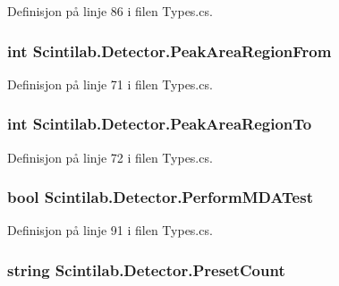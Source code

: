 Definisjon på linje 86 i filen Types.\+cs.

\hypertarget{class_scintilab_1_1_detector_a13b0edf1a6c0daa1b656ef2c0f80be3b}{
\subsubsection[{Peak\+Area\+Region\+From}]{\setlength{\rightskip}{0pt plus 5cm}int Scintilab.\+Detector.\+Peak\+Area\+Region\+From}}\label{class_scintilab_1_1_detector_a13b0edf1a6c0daa1b656ef2c0f80be3b}


Definisjon på linje 71 i filen Types.\+cs.

\hypertarget{class_scintilab_1_1_detector_a818975b79ec85722917ea173ec185d5b}{
\subsubsection[{Peak\+Area\+Region\+To}]{\setlength{\rightskip}{0pt plus 5cm}int Scintilab.\+Detector.\+Peak\+Area\+Region\+To}}\label{class_scintilab_1_1_detector_a818975b79ec85722917ea173ec185d5b}


Definisjon på linje 72 i filen Types.\+cs.

\hypertarget{class_scintilab_1_1_detector_af85caf543049c7e1be4cfc050c8982b3}{
\subsubsection[{Perform\+M\+D\+A\+Test}]{\setlength{\rightskip}{0pt plus 5cm}bool Scintilab.\+Detector.\+Perform\+M\+D\+A\+Test}}\label{class_scintilab_1_1_detector_af85caf543049c7e1be4cfc050c8982b3}


Definisjon på linje 91 i filen Types.\+cs.

\hypertarget{class_scintilab_1_1_detector_a68bb937831fda468f20adeea6e8b94ea}{
\subsubsection[{Preset\+Count}]{\setlength{\rightskip}{0pt plus 5cm}string Scintilab.\+Detector.\+Preset\+Count}}\label{class_scintilab_1_1_detector_a68bb937831fda468f20adeea6e8b94ea}


